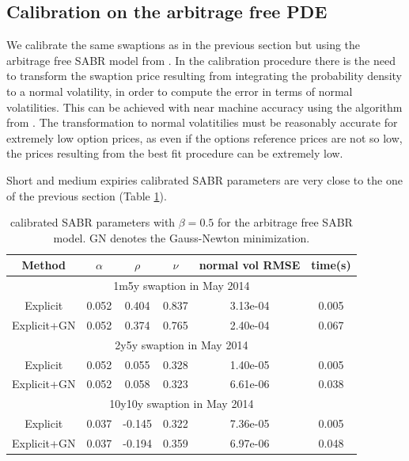 \documentclass[]{rAMF2e}
\begin{document}
\subsection{Calibration on the arbitrage free PDE}
We calibrate the same swaptions as in the previous section but using the arbitrage free SABR model from \citep{hagan2013arbitrage}. In the calibration procedure there is the need to transform the swaption price resulting from integrating the probability density to a normal volatility, in order to compute the error in terms of normal volatilities. This can be achieved with near machine accuracy using the algorithm from \citep{lefloch2014bpvol}. The transformation to normal volatitilies must be reasonably accurate for extremely low option prices, as even if the options reference prices are not so low, the prices resulting from the best fit procedure can be extremely low.

Short and medium expiries calibrated SABR parameters are very close to the one of the previous section (Table \ref{tbl:arbfree_sabr_fit}).
\begin{table}[htbp]
\begin{center}
\caption{\label{tbl:arbfree_sabr_fit}calibrated SABR parameters with $\beta=0.5$ for the arbitrage free SABR model. GN denotes the Gauss-Newton minimization.}
\begin{tabular}{c c c c c c}
\hline
Method & $\alpha$ & $\rho$ &$\nu$ & normal vol RMSE & time(s) \\
\hline
\multicolumn{6}{c}{1m5y swaption in May 2014}\\
\hline
Explicit & 0.052 & 0.404 & 0.837 & 3.13e-04 & 0.005 \\
Explicit+GN & 0.052 & 0.374 & 0.765 & 2.40e-04 & 0.067\\
\hline
\multicolumn{6}{c}{2y5y swaption in May 2014}\\
\hline
Explicit & 0.052 & 0.055 & 0.328 & 1.40e-05 & 0.005\\
Explicit+GN & 0.052 & 0.058 & 0.323 & 6.61e-06 & 0.038\\
\hline
\multicolumn{6}{c}{10y10y swaption in May 2014}\\
\hline
Explicit & 0.037 & -0.145 & 0.322 & 7.36e-05 & 0.005\\
Explicit+GN & 0.037 & -0.194 & 0.359 & 6.97e-06 & 0.048\\
\hline
\end{tabular}
\end{center}
\end{table}
\end{document}
